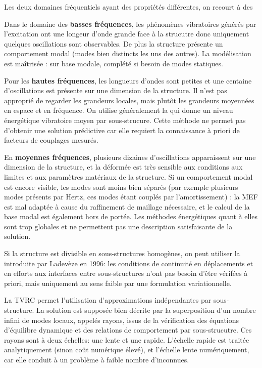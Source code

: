 Les deux domaines fréquentiels ayant des propriétés différentes, on recourt à des 

\medskip
Dans le domaine des \textbf{basses fréquences}, les phénomènes vibratoires générés par l'excitation ont une longeur
d'onde grande face à la strucutre donc uniquement quelques oscillations sont observables. De plus
la structure présente un comportement modal (modes bien distincts les uns des autres).
La modélisation est maîtrisée :  sur base modale, complété si besoin de modes
statiques.

\medskip
Pour les \textbf{hautes fréquences}, les longueurs d'ondes sont petites et une centaine d'oscillations est présente sur une 
dimension de la structure. Il n'est pas approprié de regarder les grandeurs locales, mais plutôt les 
grandeurs moyennées en espace et en fréquence. On utilise généralement la  
qui donne un niveau énergétique vibratoire moyen par sous-strucure. Cette méthode ne permet 
pas d'obtenir une solution prédictive car elle requiert la connaissance à priori de facteurs de 
couplages mesurés.

\medskip
En \textbf{moyennes fréquences}, plusieurs dizaines d'oscillations apparaissent sur une dimension de la structure, et la
déformée est très sensible aux conditions aux limites et aux paramètres matériaux
de la structure. Si un comportement modal est encore visible, les modes sont moins bien
séparés (par exemple plusieurs modes présents par Hertz, ces modes étant couplés
par l'amortissement) : la MEF est mal adaptée à cause du raffinement de maillage
nécessaire, et le calcul de la base modal est également hors de portée. Les méthodes
énergétiques quant à elles sont trop globales et ne permettent pas une description satisfaisante
de la solution.

Si la structure est divisible en sous-structures homogènes, on peut utiliser la  introduite 
par Ladevèze en 1996: 
les conditions de continuité en déplacements et en efforts aux interfaces entre 
sous-structures n'ont pas besoin d'être vérifées à priori, mais uniquement au sens faible par une 
formulation variationnelle.

La TVRC permet l'utilisation d'approximations indépendantes par sous-structure.
La solution est supposée bien décrite par la superposition d'un nombre infini de modes
locaux, appelés rayons, issus de la vérification des équations d'équilibre dynamique
et des relations de comportement par sous-strucutre.
Ces rayons sont à deux échelles: une lente et une rapide.
L'échelle rapide est traitée analytiquement (sinon coût numérique élevé), et l'échelle
lente numériquement, car elle conduit à un problème à faible nombre d'inconnues.


